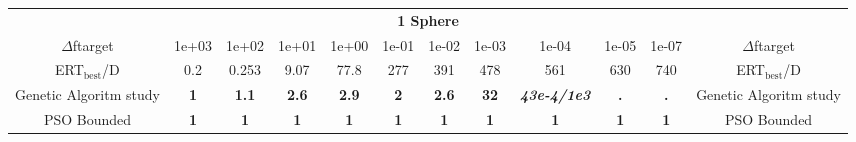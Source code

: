 \begin{tabular}{cccccccccccc}
 & \multicolumn{10}{c}{{\normalsize \textbf{1 Sphere}}}\\
$\Delta$ftarget& 1e+03& 1e+02& 1e+01& 1e+00& 1e-01& 1e-02& 1e-03& 1e-04& 1e-05& 1e-07 & $\Delta$ftarget \\
ERT$_{\textrm{best}}$/D& 0.2& 0.253& 9.07& 77.8& 277& 391& 478& 561& 630& 740 & ERT$_{\textrm{best}}$/D \\
\hline
Genetic Algoritm study & \textbf{1} & \textbf{1.1} & \textbf{2.6} & \textbf{2.9} & \textbf{2} & \textbf{2.6} & \textbf{32} & \textbf{\textit{43e-4}\textit{/1e3}} & \textbf{.} & \textbf{.} & Genetic Algoritm study \cite{add_an_entry_for_Genetic Algoritm study_in_bbob.bib}\\
PSO Bounded & \textbf{1} & \textbf{1} & \textbf{1} & \textbf{1} & \textbf{1} & \textbf{1} & \textbf{1} & \textbf{1} & \textbf{1} & \textbf{1} & PSO Bounded \cite{add_an_entry_for_PSO Bounded_in_bbob.bib}
\end{tabular}
